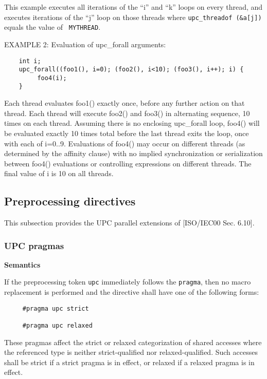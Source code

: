    This example executes all iterations of the ``i'' and ``k'' loops
   on every thread, and executes iterations of the ``j'' loop on those
   threads where {\tt upc\_threadof (\&a[j])} equals the value of {\tt
   MYTHREAD}.
   
\np EXAMPLE 2: Evaluation of upc\_forall arguments:

\begin{verbatim}
    int i;
    upc_forall((foo1(), i=0); (foo2(), i<10); (foo3(), i++); i) {
         foo4(i);
    }
\end{verbatim}
   Each thread evaluates foo1() exactly once, before any further action on that
   thread. Each thread will execute foo2() and foo3() in alternating sequence, 
   10 times on each thread. Assuming there is no enclosing upc\_forall loop, 
   foo4() will be evaluated exactly 10 times total before the last thread exits the 
   loop, once with each of i=0..9. Evaluations of foo4() may occur on different 
   threads (as determined by the affinity clause) with no implied synchronization 
   or serialization between foo4() evaluations or controlling expressions on 
   different threads. The final value of i is 10 on all threads.


\subsection{Preprocessing directives}

\npf This subsection provides the UPC parallel extensions of
   [ISO/IEC00 Sec. 6.10].

\subsubsection{UPC pragmas}
\label{pragmas}
{\bf Semantics} 

\npf If the preprocessing token {\tt upc} immediately follows
    the {\tt pragma}, then no macro replacement is performed and the
    directive shall have one of the following forms:

\begin{verbatim}
     #pragma upc strict

     #pragma upc relaxed 
\end{verbatim}
 

\np These pragmas affect the strict or relaxed
    categorization of shared accesses where the
    referenced type is neither strict-qualified nor
    relaxed-qualified. Such accesses shall be strict if a strict
    pragma is in effect, or relaxed if a relaxed pragma is in effect.

